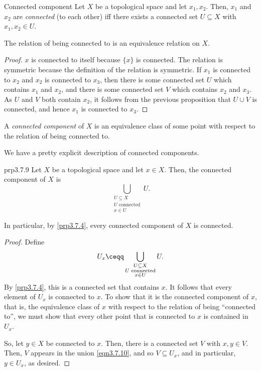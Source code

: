 \begin{dfn}{Connected component}{}
Let $X$ be a topological space and let $x_1,x_2$.  Then, $x_1$ and $x_2$ are \emph{connected} (to each other) iff there exists a connected set $U\subseteq X$ with $x_1,x_2\in U$.
\begin{prp}[breakable=false]{}{}
The relation of being connected to is an equivalence relation on $X$.
\begin{proof}
$x$ is connected to itself because $\{ x\}$ is connected.  The relation is symmetric because the definition of the relation is symmetric.  If $x_1$ is connected to $x_2$ and $x_2$ is connected to $x_3$, then there is some connected set $U$ which contains $x_1$ and $x_2$, and there is some connected set $V$ which contains $x_2$ and $x_3$.  As $U$ and $V$ both contain $x_2$, it follows from the previous proposition that $U\cup V$ is connected, and hence $x_1$ is connected to $x_3$.
\end{proof}
\end{prp}
A \emph{connected component} of $X$ is an equivalence class of some point with respect to the relation of being connected to.
\end{dfn}
We have a pretty explicit description of connected components.
\begin{prp}{}{prp3.7.9}
Let $X$ be a topological space and let $x\in X$.  Then, the connected component of $X$ is
\begin{equation}
\bigcup _{\substack{U\subseteq X \\ U\text{ connected} \\ x\in U}}U.
\end{equation}
\begin{rmk}
In particular, by \cref{prp3.7.4}, every connected component of $X$ is connected.
\end{rmk}
\begin{proof}
Define
\begin{equation}\label{eqn3.7.10}
U_x\ceqq \bigcup _{\substack{U\subseteq X \\ U\text{ connected} \\ x\in U}}U.
\end{equation}
By \cref{prp3.7.4}, this is a connected set that contains $x$.  It follows that every element of $U_x$ is connected to $x$.  To show that it is the connected component of $x$, that is, the equivalence class of $x$ with respect to the relation of being ``connected to'', we must show that every other point that is connected to $x$ is contained in $U_x$.

So, let $y\in X$ be connected to $x$.  Then, there is a connected set $V$ with $x,y\in V$.  Then, $V$ appears in the union \eqref{eqn3.7.10}, and so $V\subseteq U_x$, and in particular, $y\in U_x$, as desired.
\end{proof}
\end{prp}
